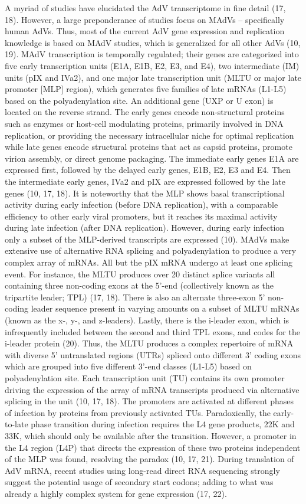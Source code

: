\documentclass[
]{article}
\begin{document}
A myriad of studies have elucidated the AdV transcriptome in fine detail
(17, 18). However, a large preponderance of studies focus on MAdVs --
specifically human AdVs. Thus, most of the current AdV gene expression
and replication knowledge is based on MAdV studies, which is generalized
for all other AdVs (10, 19). MAdV transcription is temporally regulated;
their genes are categorized into five early transcription units (E1A,
E1B, E2, E3, and E4), two intermediate (IM) units (pIX and IVa2), and
one major late transcription unit (MLTU or major late promoter {[}MLP{]}
region), which generates five families of late mRNAs (L1-L5) based on
the polyadenylation site. An additional gene (UXP or U exon) is located
on the reverse strand. The early genes encode non-structural proteins
such as enzymes or host-cell modulating proteins, primarily involved in
DNA replication, or providing the necessary intracellular niche for
optimal replication while late genes encode structural proteins that act
as capsid proteins, promote virion assembly, or direct genome packaging.
The immediate early genes E1A are expressed first, followed by the
delayed early genes, E1B, E2, E3 and E4. Then the intermediate early
genes, IVa2 and pIX are expressed followed by the late genes (10, 17,
18). It is noteworthy that the MLP shows basal transcriptional activity
during early infection (before DNA replication), with a comparable
efficiency to other early viral promoters, but it reaches its maximal
activity during late infection (after DNA replication). However, during
early infection only a subset of the MLP-derived transcripts are
expressed (10). MAdVs make extensive use of alternative RNA splicing and
polyadenylation to produce a very complex array of mRNAs. All but the
pIX mRNA undergo at least one splicing event. For instance, the MLTU
produces over 20 distinct splice variants all containing three
non-coding exons at the 5'-end (collectively known as the tripartite
leader; TPL) (17, 18). There is also an alternate three-exon 5'
non-coding leader sequence present in varying amounts on a subset of
MLTU mRNAs (known as the x-, y-, and z-leaders). Lastly, there is the
i-leader exon, which is infrequently included between the second and
third TPL exons, and codes for the i-leader protein (20). Thus, the MLTU
produces a complex repertoire of mRNA with diverse 5' untranslated
regions (UTRs) spliced onto different 3' coding exons which are grouped
into five different 3'-end classes (L1-L5) based on polyadenylation
site. Each transcription unit (TU) contains its own promoter driving the
expression of the array of mRNA transcripts produced via alternative
splicing in the unit (10, 17, 18). The promoters are activated at
different phases of infection by proteins from previously activated TUs.
Paradoxically, the early-to-late phase transition during infection
requires the L4 gene products, 22K and 33K, which should only be
available after the transition. However, a promoter in the L4 region
(L4P) that directs the expression of these two proteins independent of
the MLP was found, resolving the paradox (10, 17, 21). During
translation of AdV mRNA, recent studies using long-read direct RNA
sequencing strongly suggest the potential usage of secondary start
codons; adding to what was already a highly complex system for gene
expression (17, 22).
\end{document}
